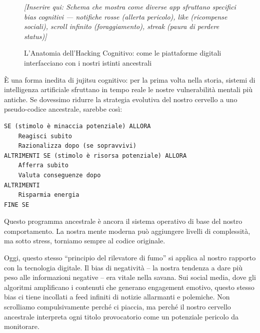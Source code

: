 \begin{figure}[h]
\centering
\textit{[Inserire qui: Schema che mostra come diverse app sfruttano specifici bias cognitivi --- notifiche rosse (allerta pericolo), like (ricompense sociali), scroll infinito (foraggiamento), streak (paura di perdere status)]}
\caption{L'Anatomia dell'Hacking Cognitivo: come le piattaforme digitali interfacciano con i nostri istinti ancestrali}
\label{fig:hacking_cognitivo}
\end{figure}

È una forma inedita di jujitsu cognitivo: per la prima volta nella storia, sistemi di intelligenza artificiale sfruttano in tempo reale le nostre vulnerabilità mentali più antiche. Se dovessimo ridurre la strategia evolutiva del nostro cervello a uno pseudo-codice ancestrale, sarebbe così:

\begin{verbatim}
SE (stimolo è minaccia potenziale) ALLORA
    Reagisci subito
    Razionalizza dopo (se sopravvivi)
ALTRIMENTI SE (stimolo è risorsa potenziale) ALLORA
    Afferra subito
    Valuta conseguenze dopo
ALTRIMENTI
    Risparmia energia
FINE SE
\end{verbatim}

Questo programma ancestrale è ancora il sistema operativo di base del nostro comportamento. La nostra mente moderna può aggiungere livelli di complessità, ma sotto stress, torniamo sempre al codice originale.

Oggi, questo stesso ``principio del rilevatore di fumo'' si applica al nostro rapporto con la tecnologia digitale. Il bias di negatività – la nostra tendenza a dare più peso alle informazioni negative – era vitale nella savana. Sui social media, dove gli algoritmi amplificano i contenuti che generano engagement emotivo, questo stesso bias ci tiene incollati a feed infiniti di notizie allarmanti e polemiche. Non scrolliamo compulsivamente perché ci piaccia, ma perché il nostro cervello ancestrale interpreta ogni titolo provocatorio come un potenziale pericolo da monitorare.

